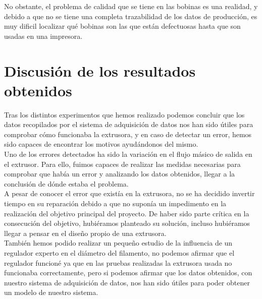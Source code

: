 No obstante, el problema de calidad que se tiene en las bobinas es una realidad, y debido a que no se tiene una completa trazabilidad de los datos de producción, es muy dificil localizar qué bobinas son las que están defectuosas hasta que son usadas en una impresora.

\section{Discusión de los resultados obtenidos}

Tras los distintos experimentos que hemos realizado podemos concluir que los datos recopilados por el sistema de adquisición de datos nos han sido útiles para comprobar cómo funcionaba la extrusora, y en caso de detectar un error, hemos sido capaces de encontrar los motivos ayudándonos del mismo.\\

Uno de los errores detectados ha sido la variación en el flujo másico de salida en el extrusor. Para ello, fuimos capaces de realizar las medidas necesarias para comprobar que había un error y analizando los datos obtenidos, llegar a la conclusión de dónde estaba el problema.\\

A pesar de conocer el error que existía en la extrusora, no se ha decidido invertir tiempo en su reparación debido a que no suponía un impedimento en la realización del objetivo principal del proyecto. De haber sido parte crítica en la consecución del objetivo, hubiéramos planteado su solución, incluso hubiéramos llegar a pensar en el diseño propio de una extrusora.\\

También hemos podido realizar un pequeño estudio de la influencia de un regulador experto en el diámetro del filamento, no podemos afirmar que el regulador funcioné ya que en las pruebas realizadas la extrusora usada no funcionaba correctamente, pero si podemos afirmar que los datos obtenidos, con nuestro sistema de adquisición de datos, nos han sido útiles para poder obtener un modelo de nuestro sistema.